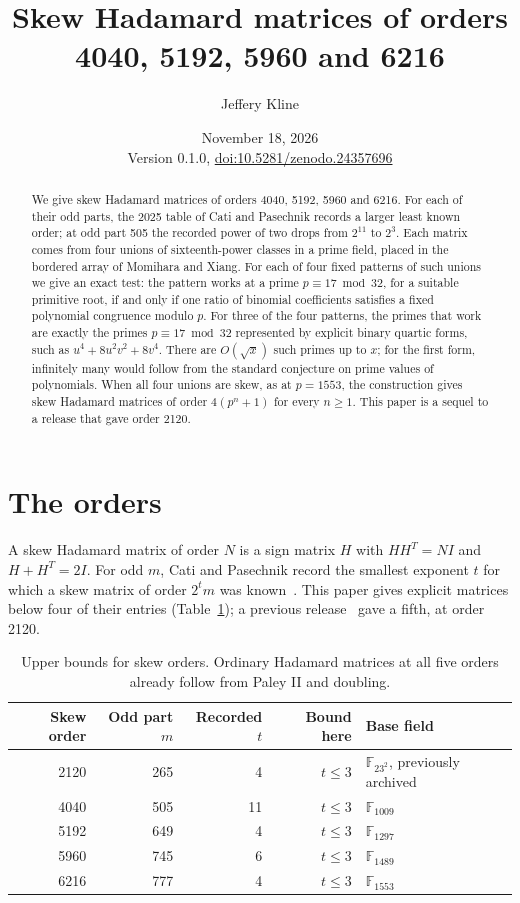 \documentclass[11pt]{article}
\title{Skew Hadamard matrices of orders 4040, 5192, 5960 and 6216}
\author{Jeffery Kline}
\date{November 18, 2026\\[3pt]\small Version 0.1.0, \href{https://doi.org/10.5281/zenodo.24357696}{doi:10.5281/zenodo.24357696}}
\newcommand{\F}{\mathbb F}
\begin{document}
\maketitle
\begin{abstract}
We give skew Hadamard matrices of orders 4040, 5192, 5960 and 6216. For each of their odd parts, the 2025 table of Cati and Pasechnik records a larger least known order; at odd part 505 the recorded power of two drops from $2^{11}$ to $2^3$. Each matrix comes from four unions of sixteenth-power classes in a prime field, placed in the bordered array of Momihara and Xiang. For each of four fixed patterns of such unions we give an exact test: the pattern works at a prime $p\equiv17\bmod32$, for a suitable primitive root, if and only if one ratio of binomial coefficients satisfies a fixed polynomial congruence modulo $p$. For three of the four patterns, the primes that work are exactly the primes $p\equiv17\bmod32$ represented by explicit binary quartic forms, such as $u^4+8u^2v^2+8v^4$. There are $O(\sqrt x)$ such primes up to $x$; for the first form, infinitely many would follow from the standard conjecture on prime values of polynomials. When all four unions are skew, as at $p=1553$, the construction gives skew Hadamard matrices of order $4(p^n+1)$ for every $n\ge1$. This paper is a sequel to a release that gave order 2120.
\end{abstract}

\section{The orders}
A skew Hadamard matrix of order $N$ is a sign matrix $H$ with $HH^T=NI$ and $H+H^T=2I$. For odd $m$, Cati and Pasechnik record the smallest exponent $t$ for which a skew matrix of order $2^t m$ was known~\cite[Table~5]{CP}. This paper gives explicit matrices below four of their entries (Table~\ref{orders}); a previous release~\cite{Kline} gave a fifth, at order 2120.
\begin{table}[ht]
\centering
\begin{tabular}{rrrrl}
\toprule
Skew order & Odd part $m$ & Recorded $t$ & Bound here & Base field\\
\midrule
2120 & 265 & 4 & $t\le3$ & $\F_{23^2}$, previously archived~\cite{Kline}\\
4040 & 505 & 11 & $t\le3$ & $\F_{1009}$\\
5192 & 649 & 4 & $t\le3$ & $\F_{1297}$\\
5960 & 745 & 6 & $t\le3$ & $\F_{1489}$\\
6216 & 777 & 4 & $t\le3$ & $\F_{1553}$\\
\bottomrule
\end{tabular}
\caption{Upper bounds for skew orders. Ordinary Hadamard matrices at all five orders already follow from Paley II and doubling.}\label{orders}
\end{table}
\end{document}
